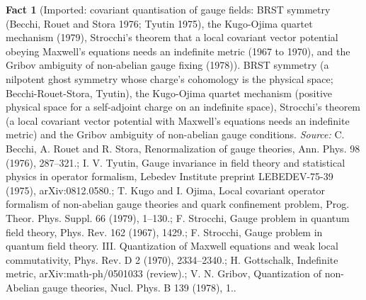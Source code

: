\documentclass[11pt]{article}
\theoremstyle{definition}
\newtheorem{fact}[theorem]{Fact}
\theoremstyle{plain}
\begin{document}
\begin{fact}[Imported: covariant quantisation of gauge fields: BRST symmetry (Becchi, Rouet and Stora 1976; Tyutin 1975), the Kugo-Ojima quartet mechanism (1979), Strocchi's theorem that a local covariant vector potential obeying Maxwell's equations needs an indefinite metric (1967 to 1970), and the Gribov ambiguity of non-abelian gauge fixing (1978)]\label{c:synthesis.imported-brst-kugo-ojima-strocchi-and-gribov}
BRST symmetry (a nilpotent ghost symmetry whose charge's cohomology is the physical space; Becchi-Rouet-Stora, Tyutin), the Kugo-Ojima quartet mechanism (positive physical space for a self-adjoint charge on an indefinite space), Strocchi's theorem (a local covariant vector potential with Maxwell's equations needs an indefinite metric) and the Gribov ambiguity of non-abelian gauge conditions.
\emph{Source:} C. Becchi, A. Rouet and R. Stora, Renormalization of gauge theories, Ann. Phys. 98 (1976), 287--321.; I. V. Tyutin, Gauge invariance in field theory and statistical physics in operator formalism, Lebedev Institute preprint LEBEDEV-75-39 (1975), arXiv:0812.0580.; T. Kugo and I. Ojima, Local covariant operator formalism of non-abelian gauge theories and quark confinement problem, Prog. Theor. Phys. Suppl. 66 (1979), 1--130.; F. Strocchi, Gauge problem in quantum field theory, Phys. Rev. 162 (1967), 1429.; F. Strocchi, Gauge problem in quantum field theory. III. Quantization of Maxwell equations and weak local commutativity, Phys. Rev. D 2 (1970), 2334--2340.; H. Gottschalk, Indefinite metric, arXiv:math-ph/0501033 (review).; V. N. Gribov, Quantization of non-Abelian gauge theories, Nucl. Phys. B 139 (1978), 1..
\end{fact}
\end{document}

